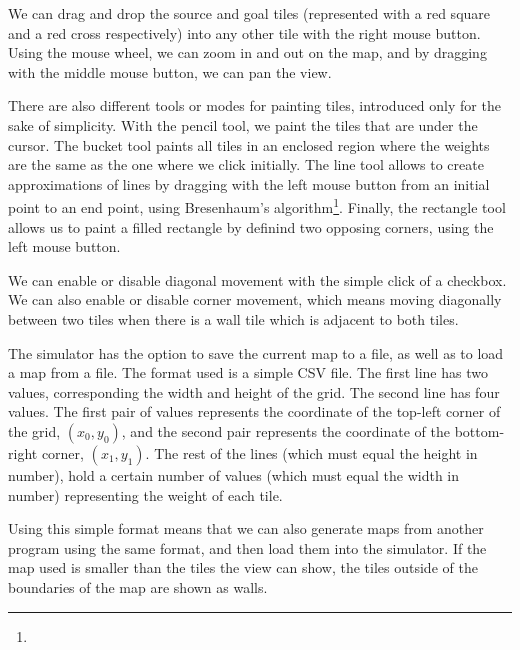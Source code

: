 \documentclass[12pt]{report}
\newcommand{\DEBUGComment}[1]{{\color{red}{#1}}}
\begin{document}
We can drag and drop the source and goal tiles (represented with a red square and a red cross respectively) into any other tile with the right mouse button. Using the mouse wheel, we can zoom in and out on the map, and by dragging with the middle mouse button, we can pan the view.

There are also different tools or modes for painting tiles, introduced only for the sake of simplicity. With the pencil tool, we paint the tiles that are under the cursor. The bucket tool paints all tiles in an enclosed region where the weights are the same as the one where we click initially. The line tool allows to create approximations of lines by dragging with the left mouse button from an initial point to an end point, using Bresenhaum's algorithm\footnote{\DEBUGComment{Add cite to reference, or talk about it in the appendix?}}. Finally, the rectangle tool allows us to paint a filled rectangle by definind two opposing corners, using the left mouse button.

We can enable or disable diagonal movement with the simple click of a checkbox. We can also enable or disable corner movement, which means moving diagonally between two tiles when there is a wall tile which is adjacent to both tiles.

The simulator has the option to save the current map to a file, as well as to load a map from a file. The format used is a simple CSV file. The first line has two values, corresponding the width and height of the grid. The second line has four values. The first pair of values represents the coordinate of the top-left corner of the grid, $(x_0, y_0)$, and the second pair represents the coordinate of the bottom-right corner, $(x_1, y_1)$. The rest of the lines (which must equal the height in number), hold a certain number of values (which must equal the width in number) representing the weight of each tile.

Using this simple format means that we can also generate maps from another program using the same format, and then load them into the simulator. If the map used is smaller than the tiles the view can show, the tiles outside of the boundaries of the map are shown as walls.
\end{document}
